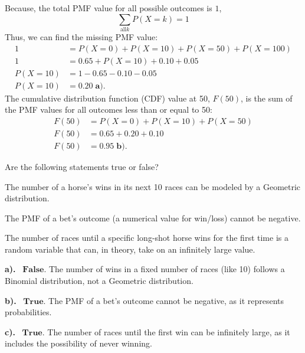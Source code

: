 \documentclass[a4paper, 10pt]{article}
\begin{document}
\begin{solution}
Because, the total PMF value for all possible outcomes is \( 1 \),
\[
    \sum_{\text{all} k} P(X = k) = 1
\]
Thus, we can find the missing PMF value:
\begin{align*}
    1 &= P(X = 0) + P(X = 10) + P(X = 50) + P(X = 100) \\
    1 &= 0.65 + P(X = 10) + 0.10 + 0.05 \\
    P(X = 10) &= 1 - 0.65 - 0.10 - 0.05 \\
    P(X = 10) &= \boxed{0.20} \; \textbf{a).}
\end{align*}
The cumulative distribution function (CDF) value at 50, \( F(50) \),
is the sum of the PMF values for all outcomes less than or equal to 50:
\begin{align*}
    F(50) &= P(X = 0) + P(X = 10) + P(X = 50) \\
    F(50) &= 0.65 + 0.20 + 0.10 \\
    F(50) &= \boxed{0.95} \; \textbf{b).}
\end{align*}
\end{solution}

\pagebreak

\begin{problem}
Are the following statements true or false?
\begin{subproblems}
    \item The number of a horse's wins in its next 10 races can be modeled by a Geometric distribution.
    \item The PMF of a bet's outcome (a numerical value for win/loss) cannot be negative.
    \item The number of races until a specific long-shot horse wins for the first time is a random variable that can,
    in theory, take on an infinitely large value.
\end{subproblems}
\end{problem}

\begin{solution}
\par\noindent\textbf{a).} \, \( \boxed{\textbf{False.}} \) The number of wins in a fixed number of races (like 10) follows a Binomial distribution, not a Geometric distribution.
\par\noindent\textbf{b).} \, \( \boxed{\textbf{True.}} \) The PMF of a bet's outcome cannot be negative, as it represents probabilities.
\par\noindent\textbf{c).} \, \( \boxed{\textbf{True.}} \) The number of races until the first win can be infinitely large, as it includes the possibility of never winning.
\end{solution}
\end{document}
